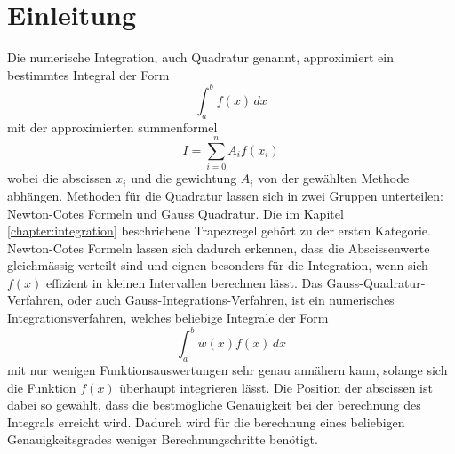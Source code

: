 %
%
%
\section{Einleitung\label{quadratur:section:einleitung}}

Die numerische Integration, auch Quadratur genannt, approximiert
 ein bestimmtes Integral der Form
\begin{equation}
    \int_{a}^{b} f(x) \,dx
\end{equation}
mit der approximierten summenformel 
\begin{equation}
    I = \sum_{i=0}^{n} A_i f(x_i)
\end{equation}
wobei die abscissen $x_i$ und die gewichtung $A_i$ von der gewählten 
Methode abhängen. 
Methoden für die Quadratur lassen sich in zwei Gruppen unterteilen: 
Newton-Cotes Formeln und Gauss Quadratur.
Die im Kapitel \ref{chapter:integration} beschriebene Trapezregel 
gehört zu der ersten Kategorie.
Newton-Cotes Formeln lassen sich dadurch erkennen, dass die Abscissenwerte 
gleichmässig verteilt sind und eignen besonders für die Integration, wenn sich $f(x)$ 
effizient in kleinen Intervallen berechnen lässt.
Das Gauss-Quadratur-Verfahren, oder auch Gauss-Integrations-Verfahren, 
ist ein numerisches Integrationsverfahren, welches beliebige Integrale der Form
\begin{equation}
\int_{a}^{b} w(x) f(x)\,dx
\end{equation}
mit nur wenigen Funktionsauswertungen sehr genau annähern kann, 
solange sich die Funktion $f(x)$ überhaupt integrieren lässt. 
Die Position der abscissen ist dabei so gewählt, 
dass die bestmögliche Genauigkeit bei der berechnung des Integrals erreicht wird.
Dadurch wird für die berechnung eines beliebigen Genauigkeitsgrades weniger Berechnungschritte benötigt.




